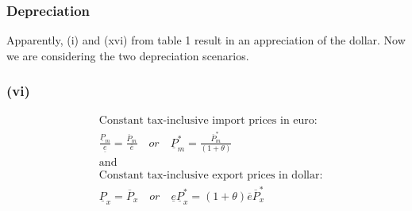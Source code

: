 \subsubsection{Depreciation}
Apparently, (i) and (xvi) from table 1 result in an appreciation of the dollar. Now we are considering the two depreciation scenarios. 

\subsubsection*{(vi)}
\begin{equation}
\begin{aligned}
&\text{Constant tax-inclusive import prices in euro:}\\ &\frac{\underline P_m}{\underline e} = \frac{\overline P_m}{\overline e} \quad or \quad \underline P^*_m  = \frac{\overline P^*_m}{(1+\theta)} \\
&\text{and}\\
&\text{Constant tax-inclusive export prices in dollar:}\\ &\underline P_x = \overline P_x \quad or \quad \underline e \underline P_x^* = (1+\theta)\overline e \overline P^*_x
\end{aligned}
\end{equation}

